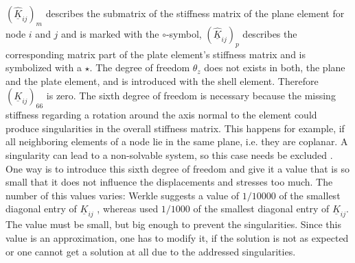  $\left(\underline{\hat{K}}_{ij}\right)_m$ describes the submatrix of the stiffness matrix of the plane element for node $i$ and $j$ and is marked with the $\circ$-symbol, $\left(\underline{\hat{K}}_{ij}\right)_p$ describes the corresponding matrix part of the plate element's stiffness matrix and is symbolized with a $\star$.
 The degree of freedom $\theta_z$ does not exists in both, the plane and the plate element, and is introduced with the shell element. Therefore $(\underline{K}_{ij})_{66}$ is zero. The sixth degree of freedom is necessary because the missing stiffness regarding a rotation around the axis normal to the element could produce singularities in the overall stiffness matrix. This happens for example, if all neighboring elements of a node lie in the same plane, i.e. they are coplanar. A singularity can lead to a non-solvable system, so this case needs be excluded \cite{steinke2005finite}. One way is to introduce this sixth degree of freedom and give it a value that is so small that it does not influence the displacements and stresses too much. The number of this values varies: Werkle suggests a value of $1/10000$ of the smallest diagonal entry of $\underline{K}_{ij}$ \cite{werkle1995finite}, whereas \cite{kansara2004development} used $1/1000$ of the smallest diagonal entry of $\underline{K}_{ij}$. The value must be small, but big enough to prevent the singularities. Since this value is an approximation, one has to modify it, if the solution is not as expected or one cannot get a solution at all due to the addressed singularities.
 
